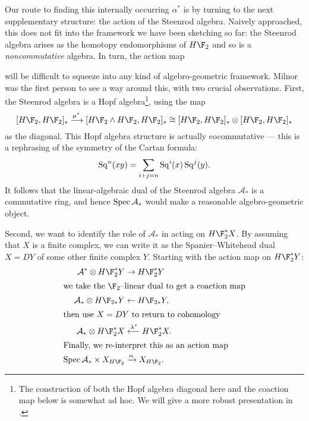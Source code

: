 Our route to finding this internally occurring $\alpha^*$ is by turning to the next supplementary structure: the action of the Steenrod algebra.  Naively approached, this does not fit into the framework we have been sketching so far: the Steenrod algebra arises as the homotopy endomorphisms of $H\F_2$ and so is a \emph{noncommutative} algebra.  In turn, the action map
\begin{center}
\end{center}
will be difficult to squeeze into any kind of algebro-geometric framework.  Milnor was the first person to see a way around this, with two crucial observations.  First, the Steenrod algebra is a Hopf algebra\footnote{The construction of both the Hopf algebra diagonal here and the coaction map below is somewhat ad hoc.  We will give a more robust presentation in .}, using the map \[[H\F_2, H\F_2]_* \xrightarrow{\mu^*} [H\F_2 \sm H\F_2, H\F_2]_* \cong [H\F_2, H\F_2]_* \otimes [H\F_2, H\F_2]_*\] as the diagonal.  This Hopf algebra structure is actually cocommutative --- this is a rephrasing of the symmetry of the Cartan formula: \[\operatorname{Sq}^n(x y) = \sum_{i+j=n} \operatorname{Sq}^i(x) \operatorname{Sq}^j(y).\]  It follows that the linear-algebraic dual of the Steenrod algebra $\mathcal A_*$ is a commutative ring, and hence $\operatorname{Spec} \mathcal A_*$ would make a reasonable algebro-geometric object.

Second, we want to identify the role of $\mathcal A_*$ in acting on $H\F_2^* X$.  By assuming that $X$ is a finite complex, we can write it as the Spanier--Whitehead dual $X = DY$ of some other finite complex $Y$.  Starting with the action map on $H\F_2^* Y$:
\begin{align*}
\mathcal A^* \otimes H\F_2^* Y & \to H\F_2^* Y \\
\intertext{we take the $\F_2$--linear dual to get a coaction map}
\mathcal A_* \otimes H\F_{2*} Y & \from H\F_{2*} Y, \\
\intertext{then use $X = DY$ to return to cohomology}
\mathcal A_* \otimes H\F_2^* X & \xleftarrow{\lambda^*} H\F_2^* X. \\
\intertext{Finally, we re-interpret this as an action map}
\Spec \mathcal A_* \times X_{H\F_2} & \xrightarrow{\alpha} X_{H\F_2}.
\end{align*}

